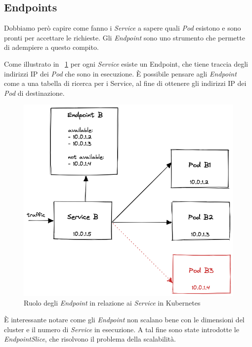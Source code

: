 \documentclass[12pt, hidelinks]{report}
\begin{document}
\subsection{Endpoints}
Dobbiamo però capire come fanno i \textit{Service} a sapere quali \textit{Pod} esistono e sono pronti per accettare le richieste. Gli \textit{Endpoint} sono uno strumento che permette di adempiere a questo compito. 

Come illustrato in \figurename~\ref{fig:kube_endpoint} per ogni \textit{Service} esiste un Endpoint, che tiene traccia degli indirizzi IP dei \textit{Pod} che sono in esecuzione. È possibile pensare agli \textit{Endpoint} come a una tabella di ricerca per i Service, al fine di ottenere gli indirizzi IP dei \textit{Pod} di destinazione. 

\begin{figure}[H]
    \centering
    \includegraphics[width=\linewidth]{5-kubernetes-endpoint.png}
    \caption{Ruolo degli \textit{Endpoint}  in relazione ai \textit{Service}  in Kubernetes \cite{demystifying-kube-proxy}}
    \label{fig:kube_endpoint}
\end{figure}

È interessante notare come gli \textit{Endpoint}  non scalano bene con le dimensioni del cluster e il numero di \textit{Service} in esecuzione. A tal fine sono state introdotte le \textit{EndpointSlice}, che risolvono il problema della scalabilità.
\end{document}
